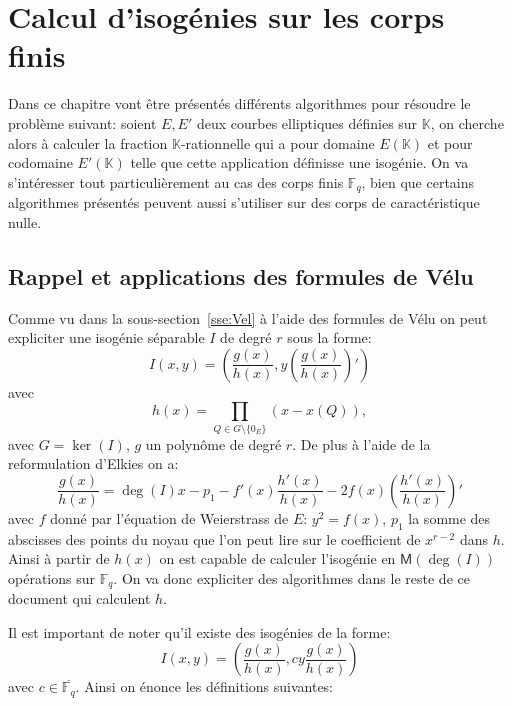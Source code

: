\documentclass[10pt,a4paper]{book}
\theoremstyle{plain}
\theoremstyle{definition}
\theoremstyle{definition}
\theoremstyle{definition}
\theoremstyle{definition}
\theoremstyle{remark}
\theoremstyle{remark}
\theoremstyle{definition}
\begin{document}
\chapter{Calcul d'isogénies sur les corps finis}
\label{cha:iso:computing}
Dans ce chapitre vont être présentés différents algorithmes pour résoudre le problème suivant: soient $E, E'$ deux courbes elliptiques définies sur $\mathbb{K}$, on cherche alors à calculer la fraction $\mathbb{K}$-rationnelle qui a pour domaine $E(\mathbb{K})$ et pour codomaine $E'(\mathbb{K})$  telle que  cette application  définisse une isogénie.
On va s'intéresser tout particulièrement au cas des corps finis $\mathbb{F}_q$, bien que certains algorithmes présentés peuvent aussi s'utiliser sur des corps de caractéristique nulle.

\section{Rappel et applications des formules de Vélu}
Comme vu dans la sous-section~\ref{sse:Vel} à l'aide des formules de Vélu on peut expliciter une isogénie séparable $I$ de degré $r$ sous la forme:
\begin{equation} 
I(x,y)=\left(\frac{g(x)}{h(x)},y\left( \frac{g(x)}{h(x)} \right)'\right)
\end{equation}
avec 
\begin{equation*}
h(x)=\prod_{Q \in G \setminus \{0_E\}}(x-x(Q)),
\end{equation*}
avec $G=\ker(I)$, $g$ un polynôme de degré $r$. De plus à l'aide de la reformulation d'Elkies on a:
\begin{equation}
\label{eq:vel:elk}
\frac{g(x)}{h(x)}= \deg(I) x -p_1 - f'(x) \frac{h'(x)}{h(x)} -2f(x)  \left(\frac{h'(x)}{h(x)}\right)'
\end{equation}
avec $f$ donné par l'équation de Weierstrass de $E$: $y^2=f(x)$, $p_1$ la somme des abscisses des points du noyau que l'on peut lire sur le coefficient de $x^{r-2}$ dans $h$. Ainsi à partir de $h(x)$ on est capable de calculer l'isogénie en $\mathsf{M}(\deg(I))$ opérations sur $\mathbb{F}_q$. On va donc expliciter des algorithmes dans le reste de ce document qui calculent $h$.


Il est important de noter qu'il existe des isogénies de la forme:
\begin{equation}
\label{eq:iso:gen}
I(x,y)=\left( \frac{g(x)}{h(x)},cy\frac{g(x)}{h(x)} \right)
\end{equation}
avec $c \in \overline{\mathbb{F}_q}$. Ainsi on énonce les définitions suivantes:
\end{document}
